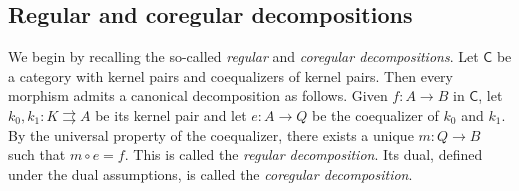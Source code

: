 \documentclass{article}
\theoremstyle{definition}
\begin{document}
\subsection{Regular and coregular decompositions}\label{subsec:beth}
We begin by recalling the so-called \textit{regular} and \textit{coregular decompositions}. Let $\mathsf{C}$ be a category with kernel pairs and coequalizers of kernel pairs. Then every morphism admits a canonical decomposition as follows. Given $f \colon A \longrightarrow B$ in $\mathsf{C}$, let $k_0, k_1 \colon K \rightrightarrows A$ be its kernel pair and let $e \colon A \longrightarrow Q$ be the coequalizer of $k_0$ and $k_1$. By the universal property of the coequalizer, there exists a unique $m \colon Q \longrightarrow B$ such that $m \circ e = f$. This is called the \emph{regular decomposition}. Its dual, defined under the dual assumptions, is called the \emph{coregular decomposition}. 
\end{document}
